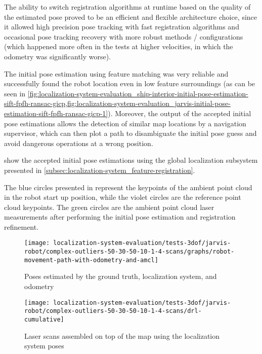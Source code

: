 The ability to switch registration algorithms at runtime based on the quality of the estimated pose proved to be an efficient and flexible architecture choice, since it allowed high precision pose tracking with fast registration algorithms and occasional pose tracking recovery with more robust methods / configurations (which happened more often in the tests at higher velocities, in which the odometry was significantly worse).

The initial pose estimation using feature matching was very reliable and successfully found the robot location even in low feature surroundings (as can be seen in \cref{fig:localization-system-evaluation_ship-interior-initial-pose-estimation-sift-fpfh-ransac-gicp,fig:localization-system-evaluation_jarvis-initial-pose-estimation-sift-fpfh-ransac-gicp-1}). Moreover, the output of the accepted initial pose estimations allows the detection of similar map locations by a navigation supervisor, which can then plot a path to disambiguate the initial pose guess and avoid dangerous operations at a wrong position.

 show the accepted initial pose estimations using the global localization subsystem presented in \cref{subsec:localization-system_feature-registration}.

The blue circles presented in  represent the keypoints of the ambient point cloud in the robot start up position, while the violet circles are the reference point cloud keypoints. The green circles are the ambient point cloud laser measurements after performing the initial pose estimation and registration refinement.


\begin{figure}[H]
	\centering
	\texttt{[image: localization-system-evaluation/tests-3dof/jarvis-robot/complex-outliers-50-30-50-10-1-4-scans/graphs/robot-movement-path-with-odometry-and-amcl]}
	\caption{Poses estimated by the ground truth, localization system,  and odometry}
	\label{fig:localization-system-evaluation_complex-path-with-outliers-50-30-50-10cm-per-sec-velocity-1-4-scans-paths}
\end{figure}

\begin{figure}[H]
	\centering
	\texttt{[image: localization-system-evaluation/tests-3dof/jarvis-robot/complex-outliers-50-30-50-10-1-4-scans/drl-cumulative]}
	\caption{Laser scans assembled on top of the map using the localization system poses}
	\label{fig:localization-system-evaluation_complex-path-with-outliers-50-30-50-10cm-per-sec-velocity-1-4-scans-drl-cumulative}
\end{figure}

